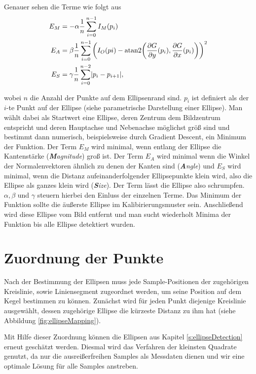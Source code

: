 Genauer sehen die Terme wie folgt aus
\begin{equation*}
	\begin{aligned}
		E_M &= -\alpha\frac{1}{n}\sum_{i=0}^{n-1}I_M(p_i) \\
		E_A &= \beta\frac{1}{n}\sum_{i=0}^{n-1}\left(I_O(pi) - \text{atan2}{\left(\frac{\partial G}{\partial y}(p_i), \frac{\partial G}{\partial x}(p_i)\right)}\right)^2 \\
		E_S &= \gamma\frac{1}{n}\sum_{i=0}^{n-2}\lvert p_i - p_{i+1}\rvert,
	\end{aligned}
\end{equation*}

wobei $n$ die Anzahl der Punkte auf dem Ellipsenrand sind. $p_i$ ist definiert als der $i$-te Punkt auf der Ellipse (siehe parametrische Darstellung einer Ellipse).
Man wählt dabei als Startwert eine Ellipse, deren Zentrum dem Bildzentrum entspricht und deren Hauptachse und Nebenachse möglichst größ sind und bestimmt dann numerisch, beispielsweise durch Gradient Descent, ein Minimum der Funktion. Der Term $E_M$ wird minimal, wenn entlang der Ellipse die Kantenstärke (\textit{\textbf{M}agnitude}) groß ist. Der Term $E_A$ wird minimal wenn die Winkel der Normalenvektoren ähnlich zu denen der Kanten sind (\textit{\textbf{A}ngle}) und $E_S$ wird minimal, wenn die Distanz aufeinanderfolgender Ellipsepunkte klein wird, also die Ellipse als ganzes klein wird (\textit{\textbf{S}ize}). Der Term lässt die Ellipse also schrumpfen. $\alpha, \beta$ und $\gamma$ steuern hierbei den Einluss der einzelnen Terme. Das Minimum der Funktion sollte die äußerste Ellipse im Kalibirierungsmuster sein. Anschließend wird diese Ellipse vom Bild entfernt und man sucht wiederholt Minima der Funktion bis alle Ellipse detektiert wurden. 




\section{Zuordnung der Punkte}
\label{s:pointMapping}
Nach der Bestimmung der Ellipsen muss jede Sample-Positionen der zugehörigen Kreislinie, sowie Liniensegment zugeordnet werden, um seine Position auf dem Kegel bestimmen zu können. 
Zunächst wird für jeden Punkt diejenige Kreislinie ausgewählt, dessen zugehörige Ellipse die kürzeste Distanz zu ihm hat (siehe Abbildung \ref{fig:ellipseMapping}).

Mit Hilfe dieser Zuordnung können die Ellipsen aus Kapitel \ref{s:ellipseDetection} erneut geschätzt werden. Diesmal wird das Verfahren der kleinsten Quadrate genutzt, da nur die ausreißerfreihen Samples als Messdaten dienen und wir eine optimale Lösung für alle Samples anstreben.  

